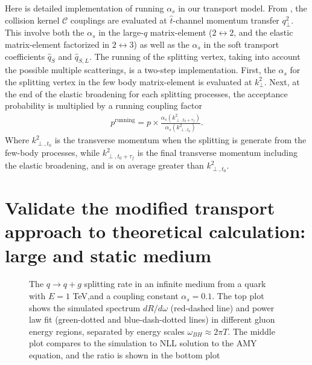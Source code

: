 Here is detailed implementation of running $\alpha_s$ in our transport model. 
From \cite{Arnold:2008zu}, the collision kernel $\mathcal{C}$ couplings are evaluated at $\hat{t}$-channel momentum transfer $q_\perp^2$.
This involve both the $\alpha_s$ in the large-$q$ matrix-element ($2\leftrightarrow 2$, and the elastic matrix-element factorized in $2\leftrightarrow 3$) as well as the $\alpha_s$ in the soft transport coefficients $\hat{q}_S$ and $\hat{q}_{S, L}$.
The running of the splitting vertex, taking into account the possible multiple scatterings, is a two-step implementation. 
First, the $\alpha_s$ for the splitting vertex in the few body matrix-element is evaluated at $k_\perp^2$.
Next, at the end of the elastic broadening for each splitting processes, the acceptance probability is multiplied by a running coupling factor
\begin{eqnarray}
p^{\textrm{running}} = p\times \frac{\alpha_s(k_{\perp,t_0+\tau_f}^2)}{\alpha_s(k_{\perp,t_0}^2)}.
\end{eqnarray}
Where $k_{\perp,t_0}^2$ is the transverse momentum when the splitting is generate from the few-body processes, while $k_{\perp,t_0+\tau_f}^2$ is the final transverse momentum including the elastic broadening, and is on average greater than $k_{\perp,t_0}^2$.

\section{Validate the modified transport approach to theoretical calculation: large and static medium}

\begin{figure}
\caption{The $q\rightarrow q+g$ splitting rate in an infinite medium from a quark with $E=1$ TeV,and a coupling constant $\alpha_s = 0.1$. The top plot shows the simulated spectrum $dR/d\omega$ (red-dashed line) and power law fit (green-dotted and blue-dash-dotted lines) in different gluon energy regions, separated by energy scales $\omega_{BH}\approx 2\pi T$. The middle plot compares to the simulation to NLL solution to the AMY equation, and the ratio is shown in the bottom plot}
\label{fig:spectrum}
\end{figure}


